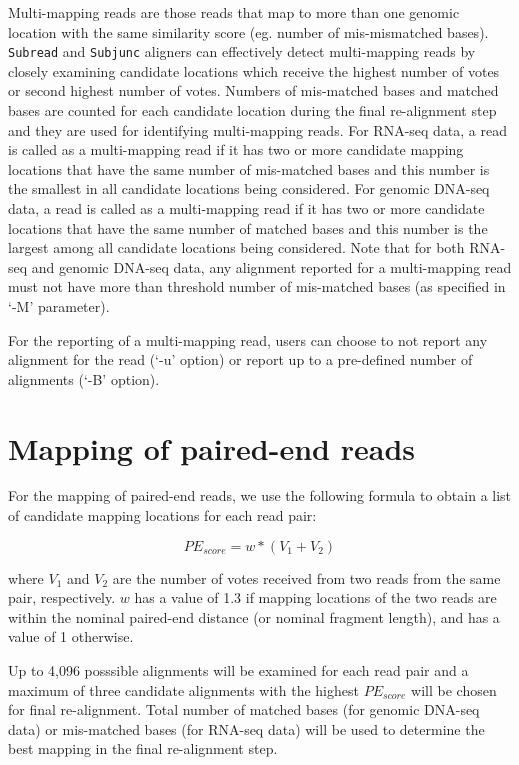 \documentclass[12pt]{report}
\newcommand{\code}[1]{{\small\texttt{#1}}}
\begin{document}
Multi-mapping reads are those reads that map to more than one genomic location with the same similarity score (eg. number of mis-mismatched bases).
\code{Subread} and \code{Subjunc} aligners can effectively detect multi-mapping reads by closely examining candidate locations which receive the highest number of votes or second highest number of votes.
Numbers of mis-matched bases and matched bases are counted for each candidate location during the final re-alignment step and they are used for identifying multi-mapping reads.
For RNA-seq data, a read is called as a multi-mapping read if it has two or more candidate mapping locations that have the same number of mis-matched bases and this number is the smallest in all candidate locations being considered.
For genomic DNA-seq data, a read is called as a multi-mapping read if it has two or more candidate locations that have the same number of matched bases and this number is the largest among all candidate locations being considered.
Note that for both RNA-seq and genomic DNA-seq data, any alignment reported for a multi-mapping read must not have more than threshold number of mis-matched bases (as specified in `-M' parameter).

For the reporting of a multi-mapping read, users can choose to not report any alignment for the read (`-u' option) or report up to a pre-defined number of alignments (`-B' option).


\section{Mapping of paired-end reads}

For the mapping of paired-end reads, we use the following formula to obtain a list of candidate mapping locations for each read pair:

$$PE_{score} = w * (V_1 + V_2) $$

where $V_1$ and $V_2$ are the number of votes received from two reads from the same pair, respectively.
$w$ has a value of 1.3 if mapping locations of the two reads are within the nominal paired-end distance (or nominal fragment length), and has a value of 1 otherwise.

Up to 4,096 posssible alignments will be examined for each read pair and a maximum of three candidate alignments with the highest $PE_{score}$ will be chosen for final re-alignment.
Total number of matched bases (for genomic DNA-seq data) or mis-matched bases (for RNA-seq data) will be used to determine the best mapping in the final re-alignment step.
\end{document}
